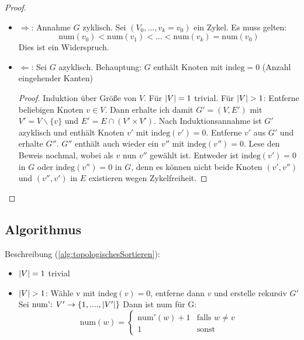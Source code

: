                 \begin{proof}
                    \begin{itemize}
                        \item $\Rightarrow$: Annahme $G$ zyklisch. Sei $(V_0,...,v_k = v_0)$ ein Zykel. Es muss gelten: 
                        $$
                            \text{num}(v_0) < \text{num}(v_1) < ... < \text{num}(v_k) = \text{num}(v_0)
                        $$
                        Dies ist ein Widerspruch.
                        \item $\Leftarrow$: Sei $G$ azyklisch. Behauptung: $G$ enthält Knoten mit $\text{indeg} = 0$ (Anzahl eingehender Kanten)
                            \begin{proof}
                                Induktion über Größe von $V$. Für $\lvert V\rvert = 1$ trivial. Für $\lvert V\rvert > 1$: Entferne beliebigen Knoten $v \in V$. Dann erhalte ich damit $G' = (V,E')$ mit $V' = V \backslash \{v\}$ und $E' = E \cap (V' \times V')$. Nach Induktionsannahme ist $G'$ azyklisch und enthält Knoten $v'$ mit $\text{indeg}(v') = 0$. Entferne $v'$ aus $G'$ und erhalte $G''$. $G''$ enthält auch wieder ein $v''$ mit $\text{indeg}(v'')=0$. Lese den Beweis nochmal, wobei als $v$ nun $v''$ gewählt ist. Entweder ist $\text{indeg}(v')=0$ in $G$ oder $\text{indeg}(v'') = 0$ in $G$, denn es können nicht beide Knoten $(v',v'')$ und $(v'',v')$ in $E$ existieren wegen Zykelfreiheit.
                            \end{proof}
                    \end{itemize}
                \end{proof}
                
                \subsection{Algorithmus}
                    Beschreibung (\autoref{alg:topologischesSortieren}):
                    \begin{itemize}
                        \item $\lvert V\rvert=1$ trivial
                        \item $\lvert V\rvert > 1$: Wähle v mit $\text{indeg}(v)=0$, entferne dann $v$ und erstelle rekursiv $G'$
                            Sei $\text{num': } V' \rightarrow \{1,...., \lvert V'\rvert\}$ Dann ist num für G:
                            $$
                                \text{num}(w) = \begin{cases}
                                                    \text{num}'(w) + 1 & \text{falls } w \neq v \\
                                                    1 & \text{sonst}
                                                \end{cases}
                            $$                          
                    \end{itemize}
                    
